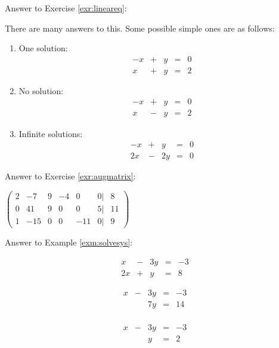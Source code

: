 \documentclass[]{book}
\theoremstyle{definition}
\theoremstyle{definition}
\theoremstyle{definition}
\theoremstyle{remark}
\begin{document}
Answer to Exercise \ref{exr:lineareq}:

There are many answers to this. Some possible simple ones are as follows:

\begin{enumerate}
\def\labelenumi{\arabic{enumi}.}
\item
  One solution: \[\begin{matrix}
           -x  & + & y & = & 0\\
           x & + &  y & = &  2
           \end{matrix}\]
\item
  No solution: \[\begin{matrix}
          -x  & + & y & = & 0\\
          x & - &  y & = &  2
          \end{matrix}\]
\item
  Infinite solutions: \[\begin{matrix}
           -x  & + & y & = & 0\\
           2x & - &  2y & = &  0
           \end{matrix}\]
\end{enumerate}

Answer to Exercise \ref{exr:augmatrix}:

\(\begin{pmatrix}  2 & -7 & 9 & -4 & 0 & 0| & 8\\  0 & 41 & 9 & 0 & 0 & 5 | & 11\\  1 & -15 & 0 & 0 & -11 & 0 | & 9  \end{pmatrix}\)

Answer to Example \ref{exm:solvesys}:

\[\begin{matrix}
            x  & - & 3y & = & -3\\
            2x & + &  y & = &  8
            \end{matrix}\]

\[\begin{matrix}
            x  & - & 3y & = & -3\\
               &   & 7y & = & 14\\          
            \end{matrix}\]

\[\begin{matrix}
            x  & - & 3y & = & -3\\
               &   & y & = & 2\\            
            \end{matrix}\]
\end{document}
